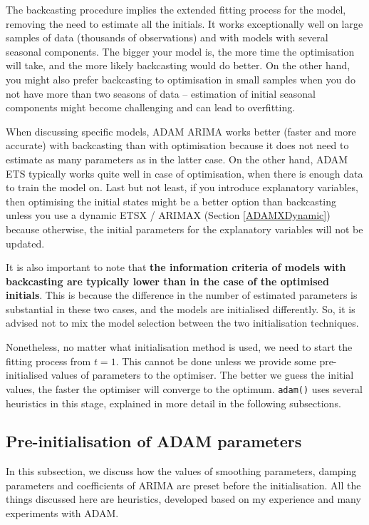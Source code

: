\documentclass[
]{book}
\theoremstyle{definition}
\theoremstyle{definition}
\theoremstyle{definition}
\theoremstyle{definition}
\theoremstyle{remark}
\begin{document}
The backcasting procedure implies the extended fitting process for the model, removing the need to estimate all the initials. It works exceptionally well on large samples of data (thousands of observations) and with models with several seasonal components. The bigger your model is, the more time the optimisation will take, and the more likely backcasting would do better. On the other hand, you might also prefer backcasting to optimisation in small samples when you do not have more than two seasons of data -- estimation of initial seasonal components might become challenging and can lead to overfitting.

When discussing specific models, ADAM ARIMA works better (faster and more accurate) with backcasting than with optimisation because it does not need to estimate as many parameters as in the latter case. On the other hand, ADAM ETS typically works quite well in case of optimisation, when there is enough data to train the model on. Last but not least, if you introduce explanatory variables, then optimising the initial states might be a better option than backcasting unless you use a dynamic ETSX / ARIMAX (Section \ref{ADAMXDynamic}) because otherwise, the initial parameters for the explanatory variables will not be updated.

It is also important to note that \textbf{the information criteria of models with backcasting are typically lower than in the case of the optimised initials}. This is because the difference in the number of estimated parameters is substantial in these two cases, and the models are initialised differently. So, it is advised not to mix the model selection between the two initialisation techniques.

Nonetheless, no matter what initialisation method is used, we need to start the fitting process from \(t=1\). This cannot be done unless we provide some pre-initialised values of parameters to the optimiser. The better we guess the initial values, the faster the optimiser will converge to the optimum. \texttt{adam()} uses several heuristics in this stage, explained in more detail in the following subsections.

\hypertarget{pre-initialisation-of-adam-parameters}{%
\subsection{Pre-initialisation of ADAM parameters}\label{pre-initialisation-of-adam-parameters}}

In this subsection, we discuss how the values of smoothing parameters, damping parameters and coefficients of ARIMA are preset before the initialisation. All the things discussed here are heuristics, developed based on my experience and many experiments with ADAM.
\end{document}
